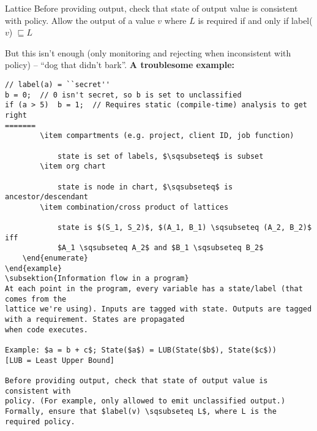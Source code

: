 \begin{definition}{Lattice}
Before providing output, check that state of output value is consistent with
policy. Allow the output of a value $v$ where $L$ is required if and only if label($v$) $\sqsubseteq L$

But this isn't enough (only monitoring and rejecting when inconsistent with
policy) -- ``dog that didn't bark''. \textbf{A troublesome example:}
\begin{verbatim}
// label(a) = ``secret''
b = 0;  // 0 isn't secret, so b is set to unclassified
if (a > 5)  b = 1;  // Requires static (compile-time) analysis to get right
=======
        \item compartments (e.g. project, client ID, job function)

            state is set of labels, $\sqsubseteq$ is subset
        \item org chart

            state is node in chart, $\sqsubseteq$ is ancestor/descendant
        \item combination/cross product of lattices

            state is $(S_1, S_2)$, $(A_1, B_1) \sqsubseteq (A_2, B_2)$ iff
            $A_1 \sqsubseteq A_2$ and $B_1 \sqsubseteq B_2$
    \end{enumerate}
\end{example}
\subsektion{Information flow in a program}
At each point in the program, every variable has a state/label (that comes from the
lattice we're using). Inputs are tagged with state. Outputs are tagged with a requirement. States are propagated
when code executes.

Example: $a = b + c$; State($a$) = LUB(State($b$), State($c$))
[LUB = Least Upper Bound]

Before providing output, check that state of output value is consistent with
policy. (For example, only allowed to emit unclassified output.) Formally, ensure that $label(v) \sqsubseteq L$, where L is the required policy.


\end{verbatim}
\end{definition}
